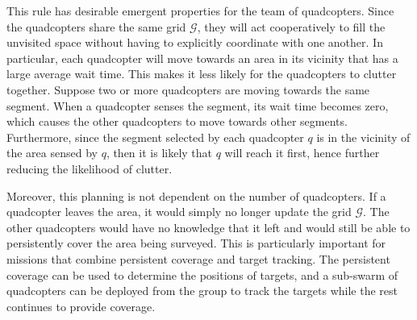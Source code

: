 \documentclass[letterpaper, 10pt, conference]{ieeeconf}
\newcommand{\Symbol}[1]{\ensuremath{\mathcal{#1}}}
\begin{document}
This rule has desirable emergent properties for the team of
quadcopters.  Since the quadcopters share the same grid $\Symbol{G}$,
they will act cooperatively to fill the unvisited space without having
to explicitly coordinate with one another. In particular, each
quadcopter will move towards an area in its vicinity that has a large
average wait time.  This makes it less likely for the quadcopters to
clutter together. Suppose two or more quadcopters are moving towards
the same segment. When a quadcopter senses the segment, its wait time
becomes zero, which causes the other quadcopters to move towards other
segments. Furthermore, since the segment selected by each quadcopter
$q$ is in the vicinity of the area sensed by $q$, then it
is likely that $q$ will reach it first, hence further reducing the
likelihood of clutter.

Moreover, this planning is not dependent on the
number of quadcopters.  If a quadcopter leaves the area, it would
simply no longer update the grid $\Symbol{G}$. The other quadcopters
would have no knowledge that it left and would still be able to
persistently cover the area being surveyed.
This is particularly important for missions
that combine persistent coverage and target tracking. The
persistent coverage can be used to determine the positions
of targets, and a sub-swarm of quadcopters can be deployed
from the group to track the targets while the rest
continues to provide coverage.
\end{document}
